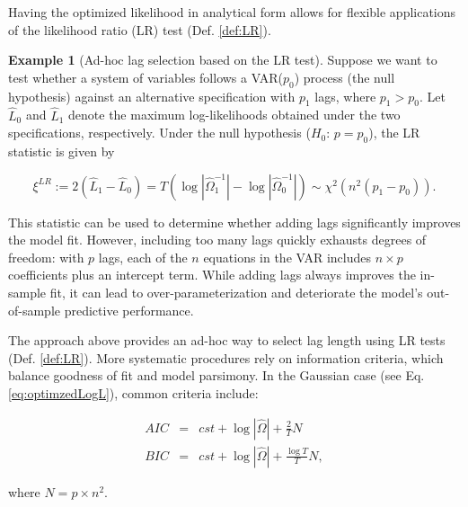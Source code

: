 \documentclass[
  12pt,
]{book}
\theoremstyle{definition}
\theoremstyle{definition}
\newtheorem{example}{Example}[chapter]
\theoremstyle{definition}
\theoremstyle{definition}
\theoremstyle{remark}
\begin{document}
Having the optimized likelihood in analytical form allows for flexible applications of the likelihood ratio (LR) test (Def. \ref{def:LR}).

\begin{example}[Ad-hoc lag selection based on the LR test]
\protect\hypertarget{exm:AdhocLagSelectLR}{}\label{exm:AdhocLagSelectLR}Suppose we want to test whether a system of variables follows a VAR(\(p_0\)) process (the null hypothesis) against an alternative specification with \(p_1\) lags, where \(p_1 > p_0\).
Let \(\hat{L}_0\) and \(\hat{L}_1\) denote the maximum log-likelihoods obtained under the two specifications, respectively.
Under the null hypothesis (\(H_0\): \(p = p_0\)), the LR statistic is given by

\begin{equation}
\xi^{LR} := 2(\hat{L}_1 - \hat{L}_0)
= T \left( \log\left|\hat{\Omega}_1^{-1}\right| - \log\left|\hat{\Omega}_0^{-1}\right| \right)
\sim \chi^2\left(n^2(p_1 - p_0)\right).
\end{equation}

This statistic can be used to determine whether adding lags significantly improves the model fit.
However, including too many lags quickly exhausts degrees of freedom: with \(p\) lags, each of the \(n\) equations in the VAR includes \(n \times p\) coefficients plus an intercept term.
While adding lags always improves the in-sample fit, it can lead to over-parameterization and deteriorate the model's out-of-sample predictive performance.
\end{example}

The approach above provides an ad-hoc way to select lag length using LR tests (Def. \ref{def:LR}).
More systematic procedures rely on information criteria, which balance goodness of fit and model parsimony.
In the Gaussian case (see Eq. \eqref{eq:optimzedLogL}), common criteria include:

\begin{eqnarray*}
AIC & = & cst + \log\left|\hat{\Omega}\right| + \frac{2}{T}N \\
BIC & = & cst + \log\left|\hat{\Omega}\right| + \frac{\log T}{T}N,
\end{eqnarray*}

where \(N = p \times n^2\).
\end{document}
